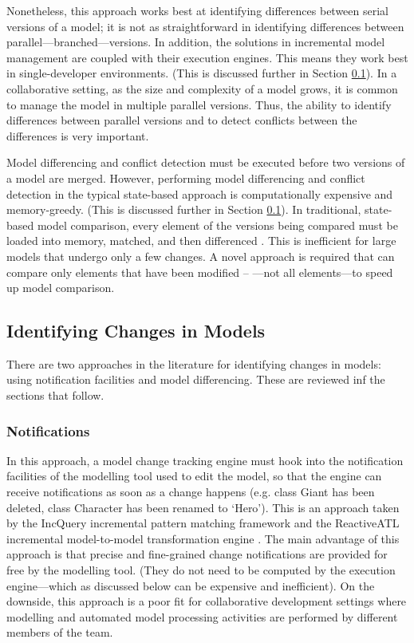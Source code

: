 Nonetheless, this approach works best at identifying differences between serial versions of a model; it is not as straightforward in identifying differences between parallel—branched—versions. In addition, the solutions in incremental model management are coupled with their execution engines. This means they work best in single-developer environments. (This is discussed further in Section \ref{sec:identifying_changes_in models}). In a collaborative setting, as the size and complexity of a model grows, it is common to manage the model in multiple parallel versions. Thus, the ability to identify differences between parallel versions and to detect conflicts between the differences is very important.

Model differencing and conflict detection must be executed before two versions of a model are merged. However, performing model differencing and conflict detection in the typical state-based approach is computationally expensive and memory-greedy. (This is discussed further in Section \ref{sec:identifying_changes_in models}). In traditional, state-based model comparison, every element of the versions being compared must be loaded into memory, matched, and then differenced \cite{emfcompare2018developer}. This is inefficient for large models that undergo only a few changes. A novel approach is required that can compare only elements that have been modified -- —not all elements—to speed up model comparison.

\subsection{Identifying Changes in Models}
\label{sec:identifying_changes_in models}
There are two approaches in the literature for identifying changes in models: using notification facilities and model differencing. These are reviewed inf the sections that follow.

\subsubsection{Notifications}
\label{sec:notifications}
In this approach, a model change tracking engine must hook into the notification facilities of the modelling tool used to edit the model, so that the engine can receive notifications as soon as a change happens (e.g. class \textsf{Giant} has been deleted, class \textsf{Character} has been renamed to ‘Hero’).
This is an approach taken by the IncQuery incremental pattern matching framework \cite{DBLP:conf/ecmdafa/RathHV12} and the ReactiveATL incremental model-to-model transformation engine \cite{DBLP:conf/ecmdafa/OgunyomiRK15}. The main advantage of this approach is that precise and fine-grained change notifications are provided for free by the modelling tool. (They do not need to be computed by the execution engine—which as discussed below can be expensive and inefficient).
On the downside, this approach is a poor fit for collaborative development settings where modelling and automated model processing activities are performed by different members of the team.


